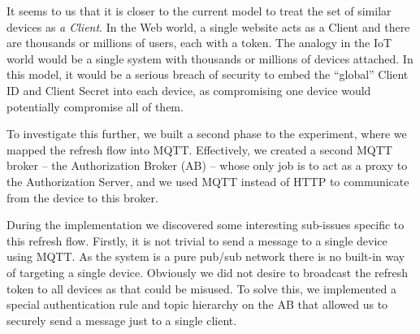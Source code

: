 \documentclass{IEEEtran}
\newif\iflong
\begin{document}
It seems to us that it is closer to the current model to treat the set of similar devices as \textit{a Client}. In the Web world, a single 
website acts as a Client and there are thousands or millions of users, each with a token. The analogy in the IoT world
would be a single system with thousands or millions of devices attached. In this model, it would be a serious
breach of security to embed the ``global'' Client ID and Client Secret into each device, as compromising one device
would potentially compromise all of them. 

To investigate this further, we built a second phase to the experiment, where we mapped the refresh flow into MQTT.
Effectively, we created a second MQTT broker -- the Authorization Broker (AB) -- whose only job is to act as a proxy to the Authorization Server, and we used MQTT instead of HTTP to communicate from the device to this broker. 
\iflong
To explain this, let us name the two brokers: the first (existing) broker is the Data Broker (DB), where data is published and received.
The second broker is the Authorization Broker (AB).
The flow works as follows:
\begin{itemize}
\item The device attempts to connect to the Data Broker. 
\item The bearer token has expired and the connection is refused.
\item The device connects instead to the Authorization Broker (with no credentials)
\item The device passes the bearer key to the Authorization Broker
\item The Authorization Broker (or an agent attached to it) adds the Client ID and
 Client Secret and calls the real Authorization Server to refresh the token.
\item The Authorization Broker then returns the new Bearer Token to the client.
\item Finally the client disconnects from the AB and tries again to connect to the DB with the new Bearer Token.
\end{itemize}

\fi
During the implementation we discovered some interesting sub-issues specific to this refresh flow.
Firstly, it is not trivial to send a message to a single device using MQTT. As the system is a pure pub/sub network
there is no built-in way of targeting a single device. Obviously we did not desire to broadcast the refresh token to 
all devices as that could be misused. To solve this, we implemented a special authentication rule and topic hierarchy on the AB that allowed us to securely send a message just to a single client.
\end{document}
